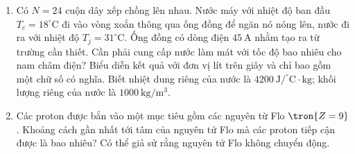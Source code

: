 \begin{vd}
\begin{enumerate}[1)]
    \item Có $N=24$ cuộn dây xếp chồng lên nhau. Nước máy với nhiệt độ ban đầu $T_c=18^\circ \mathrm{C}$ đi vào vòng xoắn thông qua ống đồng để ngăn nó nóng lên, nước đi ra với nhiệt độ $T_j=31^\circ \mathrm{C}$. Ống đồng có dòng điện $45 ~\mathrm{A}$ nhằm tạo ra từ trường cần thiết. Cần phải cung cấp nước làm mát với tốc độ bao nhiêu cho nam châm điện? Biểu diễn kết quả với đơn vị lít trên giây và chỉ bao gồm một chữ số có nghĩa. Biết nhiệt dung riêng của nước là $4200~\mathrm{J/^\circ C\cdot kg}$; khối lượng riêng của nước là $1000 ~\mathrm{kg/m^3}$.
    \item Các proton được bắn vào một mục tiêu gồm các nguyên từ Flo $\tron{Z=9}$. Khoảng cách gần nhất tới tâm của nguyên tử Flo mà các proton tiếp cận được là bao nhiêu? Có thể giả sử rằng nguyên tử Flo không chuyển động.
\end{enumerate}
\end{vd}
